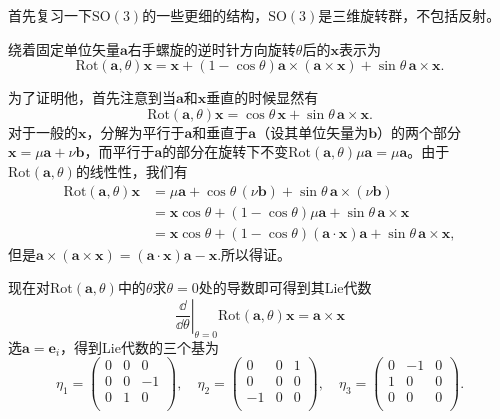 首先复习一下$\mathrm{SO}(3)$的一些更细的结构，$\mathrm{SO}(3)$是三维旋转群，不包括反射。


\pro
绕着固定单位矢量$\mathbf{a}$右手螺旋的逆时针方向旋转$\theta$后的$\mathbf{x}$表示为
\[
\mathrm{Rot}(\mathbf{a},\theta)\mathbf{x}=\mathbf{x}+(1-\cos\theta)\mathbf{a}\times(\mathbf{a}\times\mathbf{x})+
\sin\theta\,\mathbf{a}\times\mathbf{x}.
\]


为了证明他，首先注意到当$\mathbf{a}$和$\mathbf{x}$垂直的时候显然有
\[
\mathrm{Rot}(\mathbf{a},\theta)\mathbf{x}=\cos\theta\,\mathbf{x}+
\sin\theta\,\mathbf{a}\times\mathbf{x}.
\]
对于一般的$\mathbf{x}$，分解为平行于$\mathbf{a}$和垂直于$\mathbf{a}$（设其单位矢量为$\mathbf{b}$）的两个部分$\mathbf{x}=\mu\mathbf{a}+\nu\mathbf{b}$，而平行于$\mathbf{a}$的部分在旋转下不变$\mathrm{Rot}(\mathbf{a},\theta)\mu\mathbf{a}=\mu\mathbf{a}$。由于$\mathrm{Rot}(\mathbf{a},\theta)$的线性性，我们有
\[
\begin{split}
\mathrm{Rot}(\mathbf{a},\theta)\mathbf{x}&=\mu\mathbf{a}+\cos\theta\,(\nu\mathbf{b})+
\sin\theta\,\mathbf{a}\times(\nu\mathbf{b})\\
&=\mathbf{x}\cos\theta+(1-\cos\theta)\mu\mathbf{a}+
\sin\theta\,\mathbf{a}\times\mathbf{x}\\
&=\mathbf{x}\cos\theta+(1-\cos\theta)(\mathbf{a}\cdot\mathbf{x})\mathbf{a}+
\sin\theta\,\mathbf{a}\times \mathbf{x},
\end{split}
\]
但是$\mathbf{a}\times(\mathbf{a}\times\mathbf{x})=(\mathbf{a}\cdot\mathbf{x})\mathbf{a}-\mathbf{x}$.所以得证。

现在对$\mathrm{Rot}(\mathbf{a},\theta)$中的$\theta$求$\theta=0$处的导数即可得到其Lie代数
\[
\left.\frac{\dd}{\dd \theta}\right|_{\theta=0}\mathrm{Rot}(\mathbf{a},\theta)\mathbf{x}=\mathbf{a}\times\mathbf{x}
\]
选$\mathbf{a}=\mathbf{e}_i$，得到Lie代数的三个基为
\[
	\eta_1=
		\begin{pmatrix}
			0&0&0\\
			0&0&-1\\
			0&1&0\\
		\end{pmatrix},\quad
	\eta_2=
		\begin{pmatrix}
			0&0&1\\
			0&0&0\\
			-1&0&0\\
		\end{pmatrix},\quad
	\eta_3=
		\begin{pmatrix}
			0&-1&0\\
			1&0&0\\
			0&0&0\\
		\end{pmatrix}.
\]